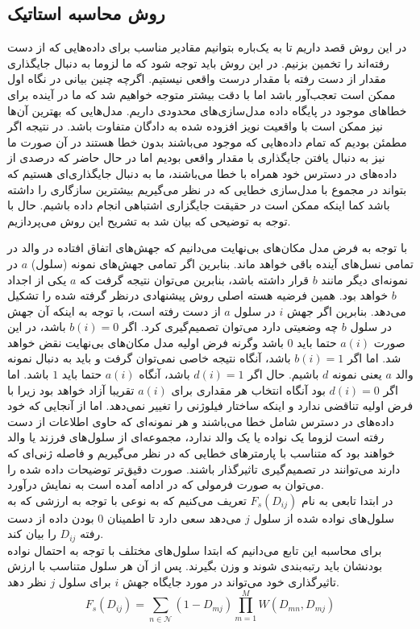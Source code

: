 \subsection{روش محاسبه استاتیک}
در این روش قصد داریم تا به یک‌باره بتوانیم مقادیر مناسب برای داده‌هایی که از دست رفته‌اند را تخمین بزنیم. در این روش باید توجه شود که ما لزوما به دنبال جایگذاری مقدار از دست رفته با مقدار درست واقعی نیستیم. اگرچه چنین بیانی در نگاه اول ممکن است تعجب‌آور باشد اما با دقت بیشتر متوجه خواهیم شد که ما در آینده برای خطاهای موجود در پایگاه داده مدل‌سازی‌های محدودی داریم. مدل‌هایی که بهترین آن‌ها نیز ممکن است با واقعیت نویز افزوده شده به دادگان متفاوت باشد. در نتیجه اگر مطمئن بودیم که تمام داده‌هایی که موجود می‌باشند بدون خطا هستند در آن صورت ما نیز به دنبال یافتن جایگذاری با مقدار واقعی بودیم اما در حال حاضر که درصدی از داده‌های در دسترس خود همراه با خطا می‌باشند، ما به دنبال جایگذاری‌ای هستیم که بتواند در مجموع با مدل‌سازی خطایی که در نظر می‌گیریم بیشترین سازگاری را داشته باشد کما اینکه ممکن است در حقیقت جایگزاری اشتباهی انجام داده باشیم. حال با توجه به توضیحی که بیان شد به تشریح این روش می‌پردازیم.

با توجه به فرض مدل مکان‌های بی‌نهایت می‌دانیم که جهش‌های اتفاق افتاده در والد در تمامی نسل‌های آینده باقی خواهد ماند. بنابرین اگر تمامی جهش‌های نمونه (سلول) $a$ در نمونه‌ای دیگر مانند $b$ قرار داشته باشد، بنابرین می‌توان نتیجه گرفت که $a$ یکی از اجداد $b$ خواهد بود. همین فرضیه هسته اصلی روش پیشنهادی درنظر گرفته شده را تشکیل می‌دهد. بنابرین اگر جهش $i$ در سلول $a$ از دست رفته است، با توجه به اینکه آن جهش در سلول $b$ چه وضعیتی دارد می‌توان تصمیم‌گیری کرد. اگر $b(i)=0$ باشد، در این صورت $a(i)$ حتما باید $0$ باشد وگرنه فرض اولیه مدل مکان‌های بی‌نهایت نقض خواهد شد. اما اگر $b(i)=1$ باشد، آنگاه نتیجه خاصی نمی‌توان گرفت و باید به دنبال نمونه والد $a$ یعنی نمونه $d$ باشیم. حال اگر $d(i)=1$ باشد، آنگاه $a(i)$ حتما باید $1$ باشد. اما اگر $d(i)=0$ بود آنگاه انتخاب هر مقداری برای $a(i)$ تقریبا آزاد خواهد بود زیرا با فرض اولیه تناقضی ندارد و اینکه ساختار فیلوژنی را تغییر نمی‌دهد. اما از آنجایی که  خود داده‌های در دسترس شامل خطا می‌باشند و هر نمونه‌ای که حاوی اطلاعات از دست رفته است لزوما یک نواده یا یک والد ندارد، مجموعه‌ای از سلول‌های فرزند یا والد خواهند بود که متناسب با پارمترهای خطایی که در نظر می‌گیریم و فاصله ژنی‌ای که دارند می‌توانند در تصمیم‌گیری تاثیرگذار باشند. صورت دقیق‌تر توضیحات داده شده را می‌توان به صورت فرمولی که در ادامه آمده است به نمایش درآورد.
\\
در ابتدا تابعی به نام $F_s(D_{ij})$ تعریف می‌کنیم که به نوعی با توجه به ارزشی که به سلول‌های نواده شده از سلول $j$ می‌دهد سعی دارد تا اطمینان $0$ بودن داده از دست رفته $D_{ij}$ را بیان کند.
\\
برای محاسبه این تابع می‌دانیم که ابتدا سلول‌های مختلف با توجه به احتمال نواده بودنشان باید رتبه‌بندی شوند و وزن بگیرند. پس از آن  هر سلول متناسب با ارزش تاثیرگذاری خود می‌تواند در مورد جایگاه جهش $i$ برای سلول $j$ نظر دهد.
\begin{equation}
	F_s(D_{ij}) = \sum_{n \in \mathcal{N}}  (1-D_{mj})  \prod_{m=1}^{M} W(D_{mn}, D_{mj})
	\label{eq:ch_pm:F_s_simple}
\end{equation}

